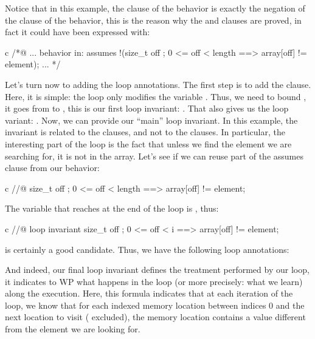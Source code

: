 Notice that in this example, the  clause of the
 behavior is exactly the negation of the 
clause of the  behavior, this is the reason why the
 and  clauses are proved, in fact it
could have been expressed with:


\begin{CodeBlock}{c}
  /*@ ...
    behavior in:
      assumes !(\forall size_t off ; 0 <= off < length ==> array[off] != element);
    ...
  */
\end{CodeBlock}


Let's turn now to adding the loop annotations. The first step is to add the
 clause. Here, it is simple: the loop only modifies the
variable . Thus, we need to bound , it goes from
 to , this is our first loop invariant:
. That also gives us the loop variant:
. Now, we can provide our ``main'' loop invariant.
In this example, the invariant is related to the  clauses, and not to the
 clauses. In particular, the interesting part of the loop is
the fact that unless we find the element we are searching for, it is not in the array.
Let's see if we can reuse part of the assumes clause from our  behavior:
\begin{CodeBlock}{c}
  //@ \forall size_t off ; 0 <= off < length ==> array[off] != element;
\end{CodeBlock}
The variable that reaches  at the end of the loop is
, thus:
\begin{CodeBlock}{c}
  //@ loop invariant \forall size_t off ; 0 <= off < i ==> array[off] != element;
\end{CodeBlock}
is certainly a good candidate. Thus, we have the following loop annotations:




And indeed, our final loop invariant defines the treatment performed by our
loop, it indicates to WP what happens in the loop (or more precisely: what we
learn) along the execution. Here, this formula indicates that at each iteration
of the loop, we know that for each indexed memory location between indices 0 and the next
location to visit ( excluded), the memory location contains a
value different from the element we are looking for.


